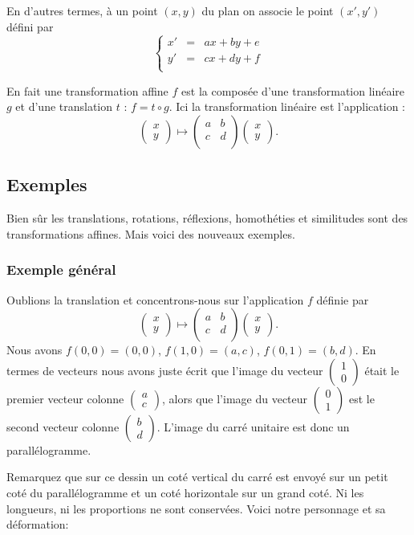 \documentclass[11pt,class=report,crop=false]{standalone}
\newcommand{\myvec}[2]{\begin{pmatrix}#1 \\ #2\end{pmatrix}}
\newcommand{\commentfigure}[1]{#1} %
\begin{document}
En d'autres termes, à un point $(x,y)$ du plan
on associe le point $(x',y')$ défini par 
$$\left \{
\begin{array}{rcl}
    x' &=& ax + by + e \\
    y' &=& cx + dy + f \\
\end{array}
\right.$$

En fait une transformation affine $f$ est la composée d'une transformation
linéaire $g$ et d'une translation $t$ : $f = t \circ g$.
Ici la transformation linéaire est l'application :
$$\myvec{x}{y} \mapsto \begin{pmatrix}a & b \\ c & d \\  \end{pmatrix}
\myvec{x}{y}.$$


\subsection{Exemples}

Bien sûr les translations, rotations, réflexions, homothéties et similitudes sont
des transformations affines. Mais voici des nouveaux exemples.

\subsubsection*{Exemple général}

Oublions la translation et concentrons-nous sur l'application $f$ définie par
$$\myvec{x}{y} \mapsto \begin{pmatrix}a & b \\ c & d \\  \end{pmatrix}
\myvec{x}{y}.$$
Nous avons $f(0,0)=(0,0)$, $f(1,0) = (a,c)$, $f(0,1)=(b,d)$.
En termes de vecteurs nous avons juste écrit que l'image du vecteur $\myvec{1}{0}$
était le premier vecteur colonne $\myvec{a}{c}$, alors que l'image du vecteur
$\myvec{0}{1}$ est le second vecteur colonne $\myvec{b}{d}$.
L'image du carré unitaire est donc un parallélogramme.


Remarquez que sur ce dessin un coté vertical du carré est envoyé sur
un petit coté du parallélogramme et un coté horizontale sur un grand coté.
Ni les longueurs, ni les proportions ne sont conservées.
Voici notre personnage et sa déformation:
\end{document}
